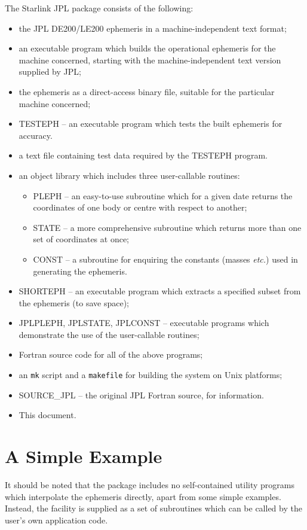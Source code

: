 \documentclass[twoside,11pt,nolof]{starlink}
\begin{document}
The Starlink JPL package consists of the following:
\begin{itemize}
\item the JPL DE200/LE200 ephemeris
in a machine-independent text format;
\item an executable program which builds the operational ephemeris
for the machine concerned, starting with the machine-independent
text version supplied by JPL;
\item the ephemeris as a direct-access binary file, suitable for
the particular machine concerned;
\item TESTEPH -- an executable program which tests the built ephemeris for
accuracy.
\item a text file containing test data required
by the TESTEPH program.
\item an object library which includes three user-callable routines:
\begin{itemize}
\item PLEPH -- an easy-to-use subroutine which for a given date
returns the coordinates of one body or centre with respect to another;
\item STATE -- a more comprehensive subroutine which returns more
than one set of coordinates at once;
\item CONST -- a subroutine for enquiring the constants (masses \emph{etc.})
used in generating the ephemeris.
\end{itemize}
\item SHORTEPH -- an executable program which extracts a specified
subset from the ephemeris (to save space);
\item JPLPLEPH, JPLSTATE, JPLCONST -- executable programs which demonstrate
the use of the user-callable routines;
\item Fortran source code for all of the above programs;
\item an \texttt{mk} script and a \texttt{makefile} for building the
system on Unix platforms;
\item SOURCE\_JPL -- the original JPL Fortran source, for information.
\item This document.
\end{itemize}

\section{A Simple Example}
\label{a_simple_example}

It should be noted that the package includes
no self-contained utility programs which interpolate the ephemeris
directly, apart from some simple examples.  Instead, the facility is
supplied as a set of subroutines which can be called by the user's own
application code.
\end{document}
